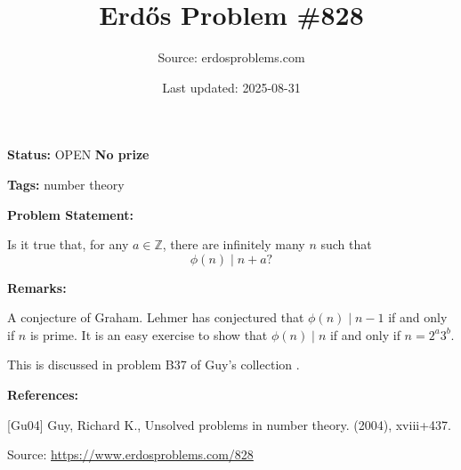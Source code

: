 \documentclass{article}
\title{Erd\H{o}s Problem \#828}
\date{Last updated: 2025-08-31}
\author{Source: erdosproblems.com}
\begin{document}
\maketitle

\noindent\textbf{Status:} OPEN \quad \textbf{No prize}

\noindent\textbf{Tags:} number theory

\medskip
\noindent\textbf{Problem Statement:}

Is it true that, for any $a\in\mathbb{Z}$, there are infinitely many $n$ such that\[\phi(n) \mid n+a?\]

\bigskip
\noindent\textbf{Remarks:}

A conjecture of Graham. Lehmer has conjectured that $\phi(n)\mid n-1$ if and only if $n$ is prime. It is an easy exercise to show that $\phi(n) \mid n$ if and only if $n=2^a3^b$.

This is discussed in problem B37 of Guy's collection \cite{Gu04}.

\bigskip
\noindent\textbf{References:}

[Gu04] Guy, Richard K., Unsolved problems in number theory. (2004), xviii+437.

\bigskip
\noindent\small{Source: \url{https://www.erdosproblems.com/828}}
\end{document}
